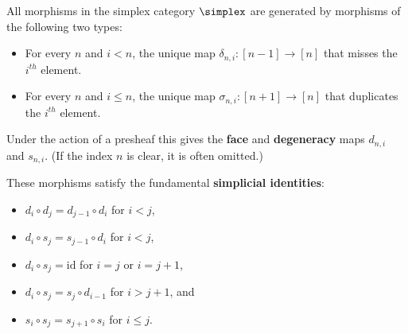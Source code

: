     \begin{property}
        All morphisms in the simplex category $\simplex$ are generated by morphisms of the following two types:
        \begin{itemize}
            \item For every $n$ and $i<n$, the unique map $\delta_{n,i}:[n-1]\rightarrow[n]$ that misses the $i^{th}$ element.
            \item For every $n$ and $i\leq n$, the unique map $\sigma_{n,i}:[n+1]\rightarrow[n]$ that duplicates the $i^{th}$ element.
        \end{itemize}
        Under the action of a presheaf this gives the \textbf{face} and \textbf{degeneracy} maps $d_{n,i}$ and $s_{n,i}$. (If the index $n$ is clear, it is often omitted.)

        These morphisms satisfy the fundamental \textbf{simplicial identities}:
        \begin{itemize}
            \item $d_i\circ d_j = d_{j-1}\circ d_i$ for $i<j$,
            \item $d_i\circ s_j = s_{j-1}\circ d_i$ for $i<j$,
            \item $d_i\circ s_j = \text{id}$ for $i=j$ or $i=j+1$,
            \item $d_i\circ s_j = s_j\circ d_{i-1}$ for $i>j+1$, and
            \item $s_i\circ s_j = s_{j+1}\circ s_i$ for $i\leq j$.
        \end{itemize}
    \end{property}


